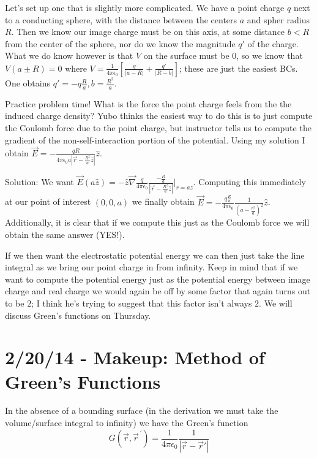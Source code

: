 \documentclass[10pt]{report}
\newcommand{\pvec}[1]{\vec{#1}^{\,\prime}}
\newcommand{\grad}[0]{\vec{\nabla}}
\newcommand{\abs}[1]{\left|#1\right|}
\begin{document}
Let's set up one that is slightly more complicated. We have a point charge $q$ next to a conducting sphere, with the distance between the centers $a$ and spher radius $R$. Then we know our image charge must be on this axis, at some distance $b < R$ from the center of the sphere, nor do we know the magnitude $q'$ of the charge. What we do know however is that $V$ on the surface must be $0$, so we know that $V(a\pm R) = 0$ where $V = \frac{1}{4\pi\epsilon_0}\left[ \frac{q}{\abs{a-R}} + \frac{q'}{\abs{R-b}} \right]$; these are just the easiest BCs. One obtains $q' = -q\frac{R}{a}, b = \frac{R^2}{a}$.

Practice problem time! What is the force the point charge feels from the the induced charge density? Yubo thinks the easiest way to do this is to just compute the Coulomb force due to the point charge, but instructor tells us to compute the gradient of the non-self-interaction portion of the potential. Using my solution I obtain $\vec{E} = -\frac{qR}{4\pi\epsilon_0 a \abs{\vec{r} - \frac{R^2}{a}\hat{z}}}\hat{z}$. 

Solution: We want $\vec{E}(a\hat{z}) = -\hat{z}\grad \frac{q}{4\pi\epsilon_0}\frac{-\frac{R}{a}}{\abs{\vec{r} - \frac{R^2}{a}\hat{z}}}\Big|_{r = az}$. Computing this immediately at our point of interest $(0, 0, a)$ we finally obtain $\vec{E} = -\frac{q\frac{R}{a}}{4\pi\epsilon_0}\frac{1}{\left(a - \frac{r^2}{a}\right)^2}\hat{z}$. Additionally, it is clear that if we compute this just as the Coulomb force we will obtain the same answer (YES!).

If we then want the electrostatic potential energy we can then just take the line integral as we bring our point charge in from infinity. Keep in mind that if we want to compute the potential energy just as the potential energy between image charge and real charge we would again be off by some factor that again turns out to be $2$; I think he's trying to suggest that this factor isn't always $2$. We will discuss Green's functions on Thursday.
\chapter{2/20/14 - Makeup: Method of Green's Functions}

In the absence of a bounding surface (in the derivation we must take the volume/surface integral to infinity) we have the Green's function
\begin{equation}
    G(\vec{r}, \pvec{r}) = \frac{1}{4\pi\epsilon_0}\frac{1}{\abs{\vec{r} - \vec{r}'}}
\end{equation}
\end{document}
